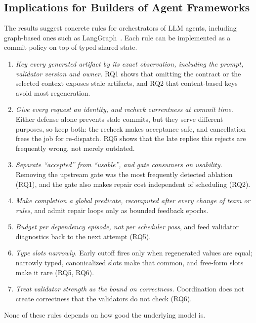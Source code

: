 \subsection{Implications for Builders of Agent Frameworks}\label{sec:implications}
The results suggest concrete rules for orchestrators of LLM agents, including graph-based ones such as LangGraph~\cite{langgraph}. Each rule can be implemented as a commit policy on top of typed shared state.
\begin{enumerate}
\item \emph{Key every generated artifact by its exact observation, including the prompt, validator version and owner.} RQ1 shows that omitting the contract or the selected context exposes stale artifacts, and RQ2 that content-based keys avoid most regeneration.
\item \emph{Give every request an identity, and recheck currentness at commit time.} Either defense alone prevents stale commits, but they serve different purposes, so keep both: the recheck makes acceptance safe, and cancellation frees the job for re-dispatch. RQ5 shows that the late replies this rejects are frequently wrong, not merely outdated.
\item \emph{Separate ``accepted'' from ``usable'', and gate consumers on usability.} Removing the upstream gate was the most frequently detected ablation (RQ1), and the gate also makes repair cost independent of scheduling (RQ2).
\item \emph{Make completion a global predicate, recomputed after every change of team or rules}, and admit repair loops only as bounded feedback epochs.
\item \emph{Budget per dependency episode, not per scheduler pass}, and feed validator diagnostics back to the next attempt (RQ5).
\item \emph{Type slots narrowly.} Early cutoff fires only when regenerated values are equal; narrowly typed, canonicalized slots make that common, and free-form slots make it rare (RQ5, RQ6).
\item \emph{Treat validator strength as the bound on correctness.} Coordination does not create correctness that the validators do not check (RQ6).
\end{enumerate}
None of these rules depends on how good the underlying model is.
